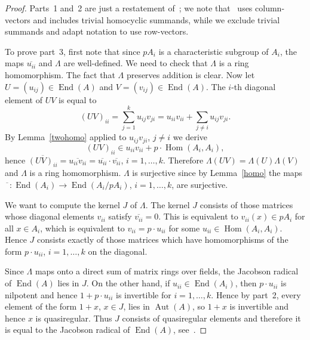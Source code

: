 \documentclass{article}
\DeclareMathOperator{\Aut}{Aut}
\DeclareMathOperator{\Hom}{Hom}
\DeclareMathOperator{\End}{End}
\begin{document}
\begin{proof}
	Parts~1 and~2 are just a restatement of~\cite[Theorem~3.2~(1) and~(2)]{mader}; we note that~\cite{mader} uses column-vectors
	and includes trivial homocyclic summands, while we exclude trivial summands and adapt notation to use row-vectors.

	To prove part~3, first note that since \( pA_i \) is a characteristic subgroup of \( A_i \), the maps \( \overline{u_{ii}} \)
	and \( \Lambda \) are well-defined. We need to check that \( \Lambda \) is a ring homomorphism.
	The fact that \( \Lambda \) preserves addition is clear. Now let \( U = (u_{ij}) \in \End(A) \)
	and \( V = (v_{ij}) \in \End(A) \). The \( i \)-th diagonal element of \( UV \) is equal to
	\[ (UV)_{ii} = \sum_{j=1}^k u_{ij}v_{ji} = u_{ii}v_{ii} + \sum_{j\neq i} u_{ij}v_{ji}. \]
	By Lemma~\ref{twohomo} applied to \( u_{ij}v_{ji} \), \( j \neq i \) we derive
	\[ (UV)_{ii} \in u_{ii}v_{ii} + p \cdot \Hom(A_i, A_i), \]
	hence \( \overline{(UV)_{ii}} = \overline{u_{ii}v_{ii}} = \overline{u_{ii}} \cdot \overline{v_{ii}} \), \( i = 1, \dots, k \).
	Therefore \( \Lambda(UV) = \Lambda(U)\Lambda(V) \) and \( \Lambda \) is a ring homomorphism.
	\( \Lambda \) is surjective since by Lemma~\ref{homo} the maps \( \overline{\phantom{u}} : \End(A_i) \to \End(A_i/pA_i) \), \( i = 1, \dots, k \),
	are surjective.

	We want to compute the kernel \( J \) of \( \Lambda \).
	The kernel \( J \) consists of those matrices whose diagonal elements \( v_{ii} \) satisfy \( \overline{v_{ii}} = 0 \).
	This is equivalent to \( v_{ii}(x) \in pA_i \) for all \( x \in A_i \), which is equivalent to \( v_{ii} = p \cdot u_{ii} \)
	for some \( u_{ii} \in \Hom(A_i, A_i) \). Hence \( J \) consists exactly of those matrices which have homomorphisms
	of the form \( p \cdot u_{ii} \), \( i = 1, \dots, k \) on the diagonal.

	Since \( \Lambda \) maps onto a direct sum of matrix rings over fields, the Jacobson radical of \( \End(A) \) lies in \( J \).
	On the other hand, if \( u_{ii} \in \End(A_i) \), then \( p \cdot u_{ii} \) is nilpotent and hence \( 1 + p \cdot u_{ii} \) is invertible
	for \( i = 1, \dots, k \). Hence by part~2, every element of the form \( 1 + x \), \( x \in J \), lies in \( \Aut(A) \),
	so \( 1 + x \) is invertible and hence \( x \) is quasiregular.
	Thus \( J \) consists of quasiregular elements and therefore it is equal to the Jacobson radical of \( \End(A) \), see~\cite[Theorem~1.2.3]{herstein}.


\end{proof}
\end{document}
